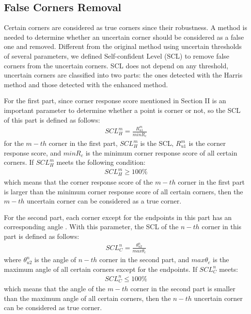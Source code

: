 \documentclass[letterpaper, 10 pt, conference]{ieeeconf}  %
\begin{document}
\subsection{False Corners Removal}

Certain corners are considered as true corners since their robustness. A method is needed to determine whether an uncertain corner should be considered as a false one and removed. Different from the original method using uncertain thresholds of several parameters, we defined Self-confident Level (SCL) to remove false corners from the uncertain corners. SCL does not depend on any threshold, uncertain corners are classified into two parts: the ones detected with the Harris method and those detected with the enhanced method.

For the first part, since corner response score mentioned in Section II is an important parameter to determine whether a point is corner or not, so the SCL of this part is defined as follows:
\begin{equation}
\begin{split}
SCL _ { H } ^ { m } = \frac { R _ { u1 } ^ { m } } { min R _ { c }  }
\end{split}
\label{SCL for Harris}
\end{equation}
for the $m-th$ corner in the first part, ${SCL _ { H } ^ { m }}$ is the SCL, ${R _ { u1 } ^ { m }}$ is the corner response score, and ${ min R _ { c }}$ is the minimum corner response score of all certain corners. If ${SCL _ { H } ^ { m }}$ meets the following condition:
\begin{equation}
\begin{split}
SCL _ { H } ^ { m } \geq 100\%
\end{split}
\label{SCL condition for Harris}
\end{equation}
which means that the corner response score of the $m-th$ corner in the first part is larger than the minimum corner response score of all certain corners, then the $m-th$ uncertain corner can be considered as a true corner. 

For the second part, each corner except for the endpoints in this part has an corresponding angle \cite{He2008Corner}. With this parameter, the SCL of the $n-th$ corner in this part is defined as follows:
\begin{equation}
\begin{split}
SCL _ { C } ^ { n } = \frac { \theta _ { u2 } ^ { n } } { max \theta _ { c }  }
\end{split}
\label{SCL for CSS}
\end{equation}
where $ { \theta _ { u2 } ^ { n } }$ is the angle of $n-th$ corner in the second part, and ${ max \theta _ { c }  }$ is the maximum angle of all certain corners except for the endpoints. If $SCL _ { C } ^ { n }$ meets:
\begin{equation}
\begin{split}
SCL _ { C } ^ { n } \leq 100\%
\end{split}
\label{SCL condition for Harris}
\end{equation}
which means that the angle of the $m-th$ corner in the second part is smaller than the maximum angle of all certain corners, then the $n-th$ uncertain corner can be considered as true corner. 
\end{document}
